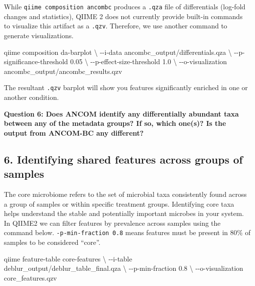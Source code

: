 \documentclass[
]{book}
\newenvironment{Shaded}{\begin{snugshade}}{\end{snugshade}}
\newcommand{\AttributeTok}[1]{\textcolor[rgb]{0.13,0.29,0.53}{#1}}
\newcommand{\DataTypeTok}[1]{\textcolor[rgb]{0.13,0.29,0.53}{#1}}
\newcommand{\ExtensionTok}[1]{#1}
\newcommand{\NormalTok}[1]{#1}
\begin{document}
While \texttt{qiime\ composition\ ancombc} produces a \texttt{.qza} file of differentials (log-fold changes and statistics), QIIME 2 does not currently provide built-in commands to visualize this artifact as a \texttt{.qzv}. Therefore, we use another command to generate visualizations.

\begin{Shaded}
\begin{Highlighting}[]
\ExtensionTok{qiime}\NormalTok{ composition da{-}barplot }\DataTypeTok{\textbackslash{}}
  \AttributeTok{{-}{-}i{-}data}\NormalTok{ ancombc\_output/differentials.qza }\DataTypeTok{\textbackslash{}}
  \AttributeTok{{-}{-}p{-}significance{-}threshold}\NormalTok{ 0.05 }\DataTypeTok{\textbackslash{}}
  \AttributeTok{{-}{-}p{-}effect{-}size{-}threshold}\NormalTok{ 1.0 }\DataTypeTok{\textbackslash{}}
  \AttributeTok{{-}{-}o{-}visualization}\NormalTok{ ancombc\_output/ancombc\_results.qzv}
\end{Highlighting}
\end{Shaded}

The resultant \texttt{.qzv} barplot will show you features significantly enriched in one or another condition.

\textbf{Question 6: Does ANCOM identify any differentially abundant taxa between any of the metadata groups? If so, which one(s)? Is the output from ANCOM-BC any different?}

\subsection{6. Identifying shared features across groups of samples}\label{core-microbiome}

The core microbiome refers to the set of microbial taxa consistently found across a group of samples or within specific treatment groups. Identifying core taxa helps understand the stable and potentially important microbes in your system. In QIIME2 we can filter features by prevalence across samples using the command below. \texttt{-p-min-fraction\ 0.8} means features must be present in 80\% of samples to be considered ``core''.

\begin{Shaded}
\begin{Highlighting}[]
\ExtensionTok{qiime}\NormalTok{ feature{-}table core{-}features }\DataTypeTok{\textbackslash{}}
  \AttributeTok{{-}{-}i{-}table}\NormalTok{ deblur\_output/deblur\_table\_final.qza }\DataTypeTok{\textbackslash{}}
  \AttributeTok{{-}{-}p{-}min{-}fraction}\NormalTok{ 0.8 }\DataTypeTok{\textbackslash{}}
  \AttributeTok{{-}{-}o{-}visualization}\NormalTok{ core\_features.qzv}
\end{Highlighting}
\end{Shaded}
\end{document}

